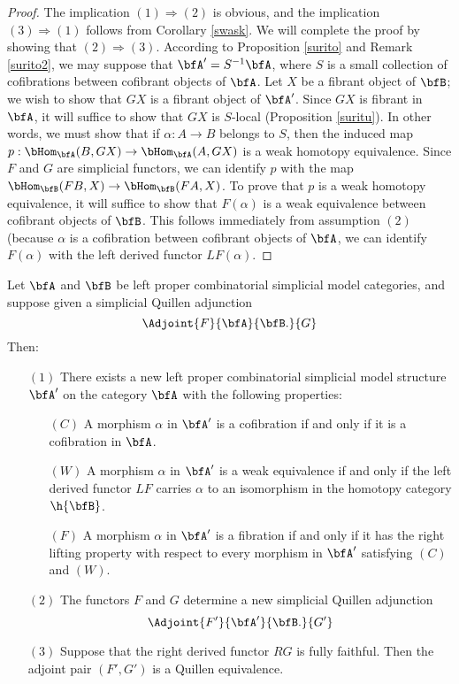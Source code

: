 \begin{proof}
The implication $(1) \Rightarrow (2)$ is obvious, and the implication $(3) \Rightarrow (1)$ follows
from Corollary \ref{swask}. We will complete the proof by showing that $(2) \Rightarrow (3)$.
According to Proposition \ref{surito} and Remark \ref{surito2}, we may suppose that $\bfA' = S^{-1} \bfA$, where $S$ is a small collection of cofibrations between cofibrant objects of $\bfA$. Let $X$ be a fibrant object of $\bfB$; we wish to show that $GX$ is a fibrant object of $\bfA'$. Since $GX$ is fibrant in
$\bfA$, it will suffice to show that $GX$ is $S$-local (Proposition \ref{suritu}). In other words, we
must show that if $\alpha: A \rightarrow B$ belongs to $S$, then the induced map
$p: \bHom_{\bfA}( B, GX) \rightarrow \bHom_{\bfA}( A, GX)$ is a weak homotopy equivalence.
Since $F$ and $G$ are simplicial functors, we can identify $p$ with the map
$\bHom_{\bfB}( FB, X) \rightarrow \bHom_{\bfB}( FA, X)$. To prove that $p$ is a weak homotopy equivalence, it will suffice to show that $F(\alpha)$ is a weak equivalence between cofibrant objects
of $\bfB$. This follows immediately from assumption $(2)$ (because $\alpha$ is a cofibration between cofibrant objects of $\bfA$, we can identify $F(\alpha)$ with the left derived functor $LF(\alpha)$.
\end{proof}

\begin{corollary}\label{swinker}
Let $\bfA$ and $\bfB$ be left proper combinatorial simplicial model categories, and suppose given
a simplicial Quillen adjunction
$$ \Adjoint{F}{\bfA}{\bfB.}{G}$$
Then:
\begin{itemize}
\item[$(1)$] There exists a new left proper combinatorial simplicial model structure $\bfA'$ on the category $\bfA$ with the following properties:
\begin{itemize}
\item[$(C)$] A morphism $\alpha$ in $\bfA'$ is a cofibration if and only if it is a cofibration in $\bfA$.
\item[$(W)$] A morphism $\alpha$ in $\bfA'$ is a weak equivalence if and only if the left
derived functor $LF$ carries $\alpha$ to an isomorphism in the homotopy category $\h{\bfB}$.
\item[$(F)$] A morphism $\alpha$ in $\bfA'$ is a fibration if and only if it has the right lifting
property with respect to every morphism in $\bfA'$ satisfying $(C)$ and $(W)$.
\end{itemize}
\item[$(2)$] The functors $F$ and $G$ determine a new simplicial Quillen adjunction
$$ \Adjoint{F'}{\bfA'}{\bfB.}{G'}$$
\item[$(3)$] Suppose that the right derived functor $RG$ is fully faithful. 
Then the adjoint pair $(F',G')$ is a Quillen equivalence.
\end{itemize}
\end{corollary}

